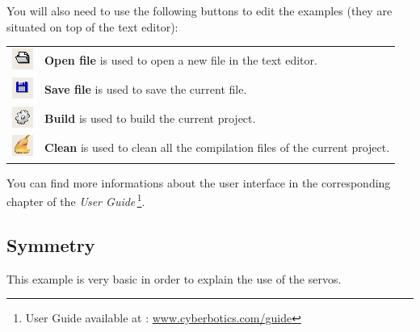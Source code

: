 \documentclass[a4paper, 12pt]{article}  		%
\begin{document}
You will also need to use the following buttons to edit the examples (they are situated on top of the text editor):
\begin{table}[H]
\begin{center}
\begin{tabular}{ c l }
\includegraphics{button_open.png} & \textbf{Open file} is used to open a new file in the text editor. \\
\includegraphics{button_save.png} & \textbf{Save file} is used to save the current file. \\
\includegraphics{button_compile.png} & \textbf{Build} is used to build the current project. \\
\includegraphics{button_clean.png} & \textbf{Clean} is used to clean all the compilation files of the current project. \\
\end{tabular}
\end{center}
\end{table}

You can find more informations about the user interface in the corresponding chapter of the \textit{User Guide}\,\footnote{User Guide available at : \url{www.cyberbotics.com/guide}}.

\newpage
\subsection{Symmetry}

This example is very basic in order to explain the use of the servos.\\
\end{document}
